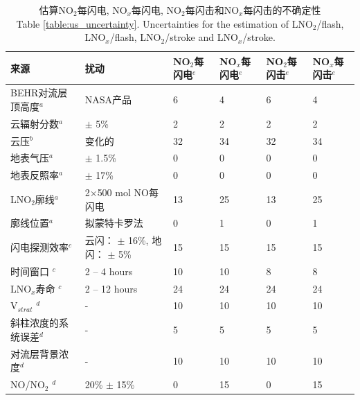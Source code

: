 \begin{table}[!htbp]
\centering
\caption{估算NO$_2$每闪电, NO$_x$每闪电, NO$_2$每闪击和NO$_x$每闪击的不确定性\\ Table \ref{table:us_uncertainty}. Uncertainties for the estimation of LNO$_2$/flash, LNO$_x$/flash, LNO$_2$/stroke and LNO$_x$/stroke.}
\scriptsize
\begin{tabular}{llllll}
\hline
来源 & 扰动 & NO$_2$每闪电$^e$ & NO$_x$每闪电$^e$ & NO$_2$每闪击$^e$ & NO$_x$每闪击$^e$ \\
\hline
BEHR对流层顶高度$^a$                    & NASA产品                              & 6   & 4   & 6   & 4 \\
云辐射分数$^a$                          & $\pm$ 5\%                            & 2   & 2   & 2   & 2 \\
云压$^b$                               & 变化的                                & 32  & 34  & 32  & 34 \\
地表气压$^a$                            & $\pm$ 1.5\%                          & 0   & 0   & 0   & 0 \\
地表反照率$^a$                          & $\pm$ 17\%                           & 0   & 0   & 0   & 0 \\
LNO$_2$廓线$^a$               & 2$\times$500 mol NO每闪电             & 13  & 25  & 13  & 25 \\
廓线位置$^a$                            & 拟蒙特卡罗法                           & 0   & 1   & 0   & 1 \\
闪电探测效率$^c$                        & 云闪： $\pm$ 16\%, 地闪： $\pm$ 5\%        & 15  & 15  & 15  & 15 \\
时间窗口%
$^c$                                  & 2 -- 4 hours                         & 10  & 10  & 8   & 8 \\
LNO$_x$寿命%
$^c$                                  & 2 -- 12 hours                        & 24  & 24  & 24  & 24 \\
V$_{strat}$%
$^d$                                  & -                                    & 10  & 10  & 10  & 10 \\
斜柱浓度的系统误差$^d$                   & -                                    & 5   & 5   & 5   & 5 \\
对流层背景浓度$^d$           & -                                    & 10  & 10  & 10  & 10  \\
NO/NO$_2$%
$^d$                                  & 20\% $\pm$ 15\%                      & 0   & 15  & 0   & 15 \\

\end{tabular}
\end{table}
